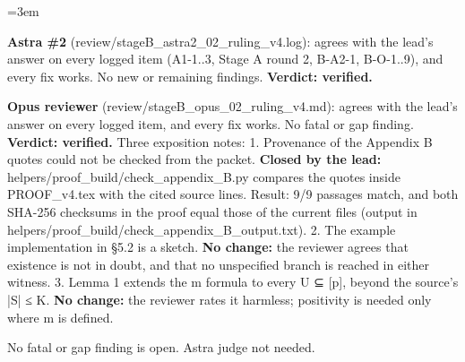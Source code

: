 \documentclass[11pt]{report}
\newenvironment{mdblock}{\begingroup\mdfont\raggedright\setlength{\parindent}{0pt}\setlength{\parskip}{0.55em}\emergencystretch=3em}{\par\endgroup}
\begin{document}
\begin{mdblock}
\begin{mdbul}
\item \textbf{Astra \#2} (review/stageB\_astra2\_02\_ruling\_v4.log): agrees with the lead's answer on every logged item (A1-1..3, Stage A round 2, B-A2-1, B-O-1..9), and every fix works. No new or remaining findings. \textbf{Verdict: verified.}
\item \textbf{Opus reviewer} (review/stageB\_opus\_02\_ruling\_v4.md): agrees with the lead's answer on every logged item, and every fix works. No fatal or gap finding. \textbf{Verdict: verified.} Three exposition notes: 1. Provenance of the Appendix B quotes could not be checked from the packet. \textbf{Closed by the lead:} helpers/proof\_build/check\_appendix\_B.py compares the quotes inside PROOF\_v4.tex with the cited source lines. Result: 9/9 passages match, and both SHA-256 checksums in the proof equal those of the current files (output in helpers/proof\_build/check\_appendix\_B\_output.txt). 2. The example implementation in §5.2 is a sketch. \textbf{No change:} the reviewer agrees that existence is not in doubt, and that no unspecified branch is reached in either witness. 3. Lemma 1 extends the m formula to every U ⊆ [p], beyond the source's |S| ≤ K. \textbf{No change:} the reviewer rates it harmless; positivity is needed only where m is defined.
\end{mdbul}

No fatal or gap finding is open. Astra judge not needed.
\end{mdblock}
\end{document}
